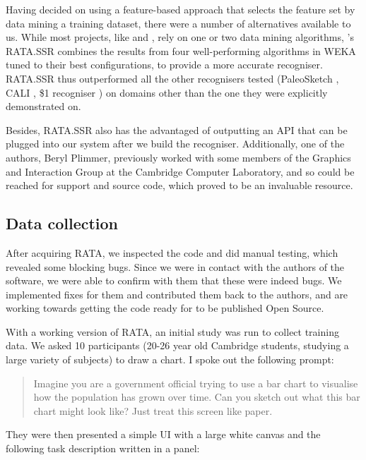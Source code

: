	Having decided on using a feature-based approach that selects the feature set by data mining a training dataset, there were a number of alternatives available to us. While most projects, like \citep{rubine_specifying_1991} and \citep{willems_iconic_2009}, rely on one or two data mining algorithms, \citep{chang_rata._2010}'s RATA.SSR combines the results from four well-performing algorithms in WEKA \citep{hall_weka_2009} tuned to their best configurations, to provide a more accurate recogniser. RATA.SSR thus outperformed all the other recognisers tested (PaleoSketch \citep{paulson_paleosketch:_2008}, CALI \citep{fonseca_cali:_2002}, \$1 recogniser \citep{wobbrock_gestures_2007}) on domains other than the one they were explicitly demonstrated on. 
	
	Besides, RATA.SSR also has the advantaged of outputting an API that can be plugged into our system after we build the recogniser. Additionally, one of the authors, Beryl Plimmer, previously worked with some members of the Graphics and Interaction Group at the Cambridge Computer Laboratory, and so could be reached for support and source code, which proved to be an invaluable resource.
	
	\subsection{Data collection}
	After acquiring RATA, we inspected the code and did manual testing, which revealed some blocking bugs. Since we were in contact with the authors of the software, we were able to confirm with them that these were indeed bugs. We implemented fixes for them and contributed them back to the authors, and are working towards getting the code ready for to be published Open Source.
	
	With a working version of RATA, an initial study was run to collect training data. We asked 10 participants (20-26 year old Cambridge students, studying a large variety of subjects) to draw a chart. I spoke out the following prompt:
	
	\begin{quotation}
	Imagine you are a government official trying to use a bar chart to visualise how the population has grown over time. Can you sketch out what this bar chart might look like? Just treat this screen like paper.
	\end{quotation}
	
	 They were then presented a simple UI with a large white canvas and the following task description written in a panel:
	
